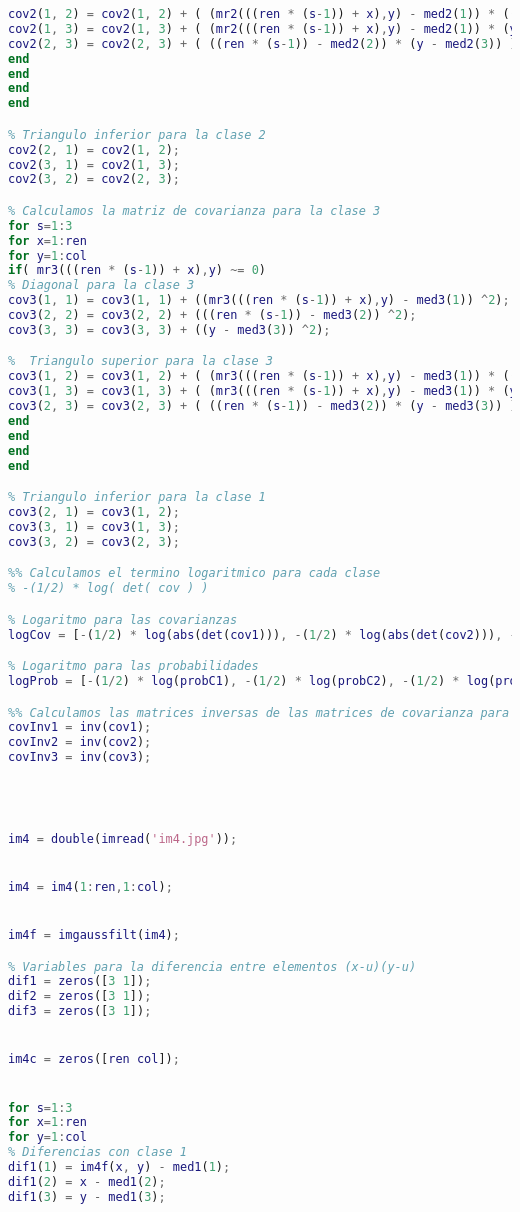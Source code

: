 \documentclass[10pt,journal,compsoc]{IEEEtran}\usepackage[T1]{fontenc}                              %
\begin{document}
\begin{lstlisting}[language=Matlab,basicstyle=\small]
%  Triangulo superior para la clase 2
cov2(1, 2) = cov2(1, 2) + ( (mr2(((ren * (s-1)) + x),y) - med2(1)) * ((ren * (s-1)) - med2(2)) );
cov2(1, 3) = cov2(1, 3) + ( (mr2(((ren * (s-1)) + x),y) - med2(1)) * (y - med2(3)) );
cov2(2, 3) = cov2(2, 3) + ( ((ren * (s-1)) - med2(2)) * (y - med2(3)) );
end
end
end
end

% Triangulo inferior para la clase 2
cov2(2, 1) = cov2(1, 2);
cov2(3, 1) = cov2(1, 3);
cov2(3, 2) = cov2(2, 3);

% Calculamos la matriz de covarianza para la clase 3
for s=1:3
for x=1:ren
for y=1:col
if( mr3(((ren * (s-1)) + x),y) ~= 0)
% Diagonal para la clase 3
cov3(1, 1) = cov3(1, 1) + ((mr3(((ren * (s-1)) + x),y) - med3(1)) ^2);
cov3(2, 2) = cov3(2, 2) + (((ren * (s-1)) - med3(2)) ^2);
cov3(3, 3) = cov3(3, 3) + ((y - med3(3)) ^2);

%  Triangulo superior para la clase 3
cov3(1, 2) = cov3(1, 2) + ( (mr3(((ren * (s-1)) + x),y) - med3(1)) * ((ren * (s-1)) - med3(2)) );
cov3(1, 3) = cov3(1, 3) + ( (mr3(((ren * (s-1)) + x),y) - med3(1)) * (y - med3(3)) );
cov3(2, 3) = cov3(2, 3) + ( ((ren * (s-1)) - med3(2)) * (y - med3(3)) );
end
end
end
end

% Triangulo inferior para la clase 1
cov3(2, 1) = cov3(1, 2);
cov3(3, 1) = cov3(1, 3);
cov3(3, 2) = cov3(2, 3);

%% Calculamos el termino logaritmico para cada clase
% -(1/2) * log( det( cov ) )

% Logaritmo para las covarianzas
logCov = [-(1/2) * log(abs(det(cov1))), -(1/2) * log(abs(det(cov2))), -(1/2) * log(abs(det(cov3)))];

% Logaritmo para las probabilidades
logProb = [-(1/2) * log(probC1), -(1/2) * log(probC2), -(1/2) * log(probC3)];

%% Calculamos las matrices inversas de las matrices de covarianza para cada clase
covInv1 = inv(cov1);
covInv2 = inv(cov2);
covInv3 = inv(cov3);




im4 = double(imread('im4.jpg'));


im4 = im4(1:ren,1:col);


im4f = imgaussfilt(im4);

% Variables para la diferencia entre elementos (x-u)(y-u)
dif1 = zeros([3 1]);
dif2 = zeros([3 1]);
dif3 = zeros([3 1]);


im4c = zeros([ren col]);


for s=1:3
for x=1:ren
for y=1:col
% Diferencias con clase 1
dif1(1) = im4f(x, y) - med1(1);
dif1(2) = x - med1(2);
dif1(3) = y - med1(3);


\end{lstlisting}
\end{document}
